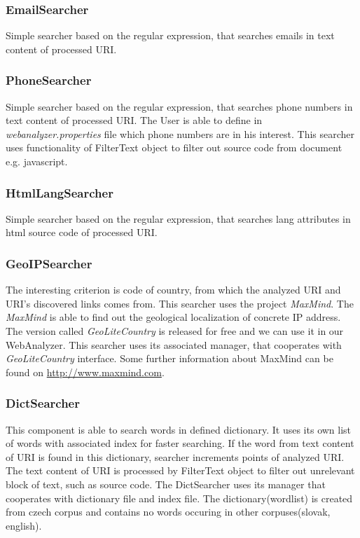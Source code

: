 \documentclass[11pt,a4paper]{article}
\begin{document}
\subsubsection*{EmailSearcher}
Simple searcher based on the regular expression, that searches emails in text content of processed URI.

\subsubsection*{PhoneSearcher}
Simple searcher based on the regular expression, that searches phone numbers in text content of processed URI. The User is able to define in \emph{web\-a\-na\-lyzer.properties} file which phone numbers are in his interest. This searcher uses functionality of FilterText object to filter out source code from document  e.g. javascript.

\subsubsection*{HtmlLangSearcher}
Simple searcher based on the regular expression, that searches lang attributes in html source code of processed URI.

\subsubsection*{GeoIPSearcher}
The interesting criterion is code of country, from which the analyzed URI and URI's discovered links comes from. This searcher uses the project \emph{MaxMind}. The \emph{MaxMind} is able to find out the geological localization of concrete IP address. The version called \emph{GeoLiteCountry} is released for free and we can use it in our WebAnalyzer. This searcher uses its associated manager, that cooperates with \emph{GeoLiteCountry} interface. Some further information about MaxMind can be found on \url{http://www.maxmind.com}.

\subsubsection*{DictSearcher}
This component is able to search words in defined dictionary. It uses its own list of words with associated index for faster searching. If the word from text content of URI is found in this dictionary, searcher increments points of analyzed URI. The text content of URI is processed by FilterText object to filter out unrelevant block of text, such as source code. The DictSearcher uses its manager that cooperates with dictionary file and index file. The dictionary(wordlist) is created from czech corpus and contains no words occuring in other corpuses(slovak, english).
\end{document}
